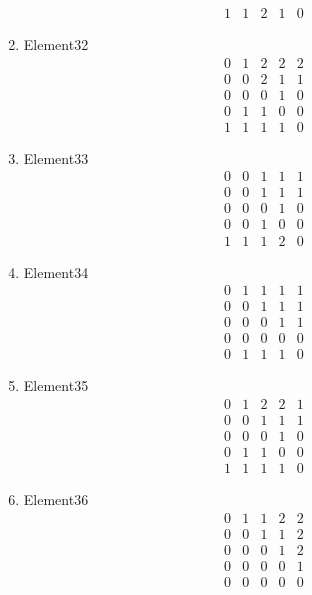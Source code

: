 \documentclass[12pt]{article}
\begin{document}
\begin{multicols}{3}
\begin{enumerate}
\begin{equation*}
\begin{array}{ccccc}
1&1&2&1&0
\end{array}
\end{equation*}
\item Element32
\begin{equation*}
\begin{array}{ccccc}
0&1&2&2&2\\
0&0&2&1&1\\
0&0&0&1&0\\
0&1&1&0&0\\
1&1&1&1&0
\end{array}
\end{equation*}
\item Element33
\begin{equation*}
\begin{array}{ccccc}
0&0&1&1&1\\
0&0&1&1&1\\
0&0&0&1&0\\
0&0&1&0&0\\
1&1&1&2&0
\end{array}
\end{equation*}
\item Element34
\begin{equation*}
\begin{array}{ccccc}
0&1&1&1&1\\
0&0&1&1&1\\
0&0&0&1&1\\
0&0&0&0&0\\
0&1&1&1&0
\end{array}
\end{equation*}
\item Element35
\begin{equation*}
\begin{array}{ccccc}
0&1&2&2&1\\
0&0&1&1&1\\
0&0&0&1&0\\
0&1&1&0&0\\
1&1&1&1&0
\end{array}
\end{equation*}
\item Element36
\begin{equation*}
\begin{array}{ccccc}
0&1&1&2&2\\
0&0&1&1&2\\
0&0&0&1&2\\
0&0&0&0&1\\
0&0&0&0&0
\end{array}
\end{equation*}

\end{enumerate}
\end{multicols}
\end{document}
